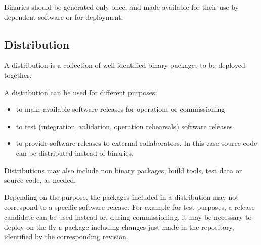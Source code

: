 Binaries should be generated only once, and made available for their use by dependent software or for deployment.


\subsection{Distribution} \label{sec:distribution}

A distribution is a collection of well identified binary packages to be deployed together.

A distribution can be used for different purposes:

\begin{itemize}
\item to make available software releases for operations or commissioning
\item to test (integration, validation, operation rehearsals) software releases
\item to provide software releases to external collaborators. In this case source code can be distributed instead of binaries.
\end{itemize}

Distributions may also include non binary packages, build tools, test data or source code, as needed.

Depending on the purpose, the packages included in a distribution may not correspond to a specific software release.
For example for test purposes, a release candidate can be used instead or, during commissioning,
it may be necessary to deploy on the fly a package including changes just made in the repository,
identified by the corresponding revision.

